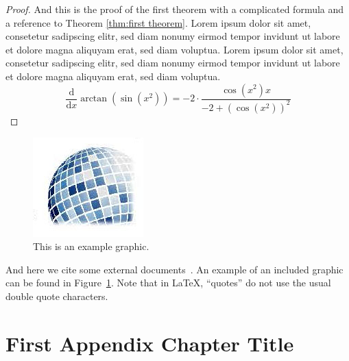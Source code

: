 \documentclass[a4paper, oneside]{discothesis}
\begin{document}
\begin{proof}
	And this is the proof of the first theorem with a complicated formula and a reference to Theorem \ref{thm:first theorem}. Lorem ipsum dolor sit amet, consetetur sadipscing elitr, sed diam nonumy eirmod tempor invidunt ut labore et dolore magna aliquyam erat, sed diam voluptua. Lorem ipsum dolor sit amet, consetetur sadipscing elitr, sed diam nonumy eirmod tempor invidunt ut labore et dolore magna aliquyam erat, sed diam voluptua.
	\begin{equation}
		{\frac {\mathrm d}{\mathrm dx}}\arctan(\sin({x}^{2}))=-2 \cdot {\frac {\cos({x}^{2})x}{-2+\left (\cos({x}^{2})\right )^{2}}}
	\end{equation}	
\end{proof}

\begin{figure}
    \centering
    \includegraphics[width=0.2\columnwidth]{figures/disco_logo_faded}
    \caption{This is an example graphic.}
    \label{fig:example_figure}
\end{figure}

And here we cite some external documents~\cite{TestReference, TestReference2}.
An example of an included graphic can be found in Figure~\ref{fig:example_figure}.
Note that in \LaTeX, ``quotes'' do not use the usual double quote characters.




\appendix
\chapter{First Appendix Chapter Title}
\end{document}
